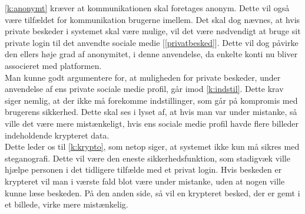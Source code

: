\ref{k:anonymt} kræver at kommunikationen skal foretages anonym. Dette vil også være tilfældet for kommunikation brugerne imellem. Det skal dog nævnes, at hvis private beskeder i systemet skal være mulige, vil det være nødvendigt at bruge sit private login til det anvendte sociale medie [\ref{privatbesked}]. Dette vil dog påvirke den ellers høje grad af anonymitet, i denne anvendelse, da enkelte konti nu bliver associeret med platformen. \\
Man kunne godt argumentere for, at muligheden for private beskeder, under anvendelse af ens private sociale medie profil, går imod \ref{k:indstil}. Dette krav siger nemlig, at der ikke må forekomme indstillinger, som går på kompromis med brugerens sikkerhed. Dette skal ses i lyset af, at hvis man var under mistanke, så ville det være mere mistænkeligt, hvis ens sociale medie profil havde flere billeder indeholdende krypteret data. \\
Dette leder os til \ref{k:krypto}, som netop siger, at systemet ikke kun må sikres med steganografi. Dette vil være den eneste sikkerhedsfunktion, som stadigvæk ville hjælpe personen i det tidligere tilfælde med et privat login. Hvis beskeden er krypteret vil man i værste fald blot være under mistanke, uden at nogen ville kunne læse beskeden. På den anden side, så vil en krypteret besked, der er gemt i et billede, virke mere mistænkelig.





